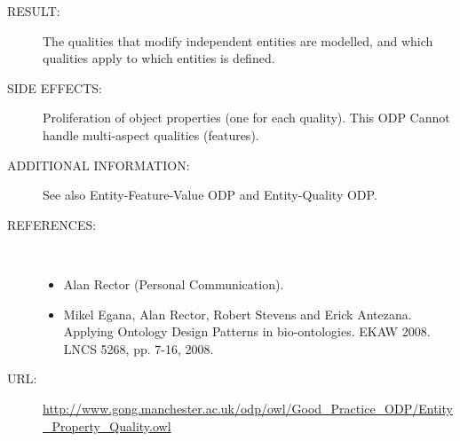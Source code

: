 \begin{description}
\item [RESULT:] The qualities that modify independent entities are modelled, and which qualities apply to which entities is defined.

\item [SIDE EFFECTS:] Proliferation of object properties (one for each quality). This ODP Cannot handle multi-aspect qualities (features).

\item [ADDITIONAL INFORMATION:] See also Entity-Feature-Value ODP and Entity-Quality ODP.

\item [REFERENCES: ] ~\begin{itemize}
\item Alan Rector (Personal Communication).
\item Mikel Egana, Alan Rector, Robert Stevens and Erick Antezana. Applying Ontology Design Patterns in bio-ontologies. EKAW 2008. LNCS 5268, pp. 7-16, 2008.\end{itemize}
\item [URL: ] \url{http://www.gong.manchester.ac.uk/odp/owl/Good_Practice_ODP/Entity_Property_Quality.owl} \end{description}